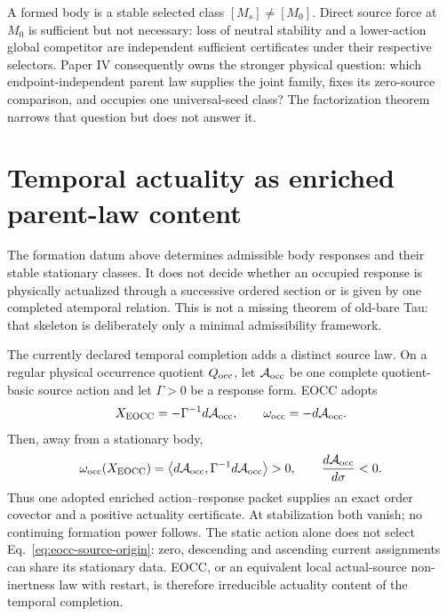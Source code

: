 \documentclass[11pt]{article}
\begin{document}
A formed body is a stable selected class $[M_s]\ne[M_0]$.  Direct source force
at $M_0$ is sufficient but not necessary: loss of neutral stability and a
lower-action global competitor are independent sufficient certificates under
their respective selectors.  Paper IV consequently owns the stronger
physical question: which endpoint-independent parent law supplies the joint
family, fixes its zero-source comparison, and occupies one universal-seed
class?  The factorization theorem narrows that question but does not answer it.

\section{Temporal actuality as enriched parent-law content}

The formation datum above determines admissible body responses and their
stable stationary classes.  It does not decide whether an occupied response
is physically actualized through a successive ordered section or is given by
one completed atemporal relation.  This is not a missing theorem of old-bare
Tau: that skeleton is deliberately only a minimal admissibility framework.

The currently declared temporal completion adds a distinct source law.  On a
regular physical occurrence quotient $Q_{\rm occ}$, let
$\mathcal A_{\rm occ}$ be one complete quotient-basic source action and let
$\Gamma>0$ be a response form.  EOCC adopts
\begin{equation}
 X_{\rm EOCC}=-\Gamma^{-1}d\mathcal A_{\rm occ},
 \qquad
 \omega_{\rm occ}=-d\mathcal A_{\rm occ}.
 \label{eq:eocc-source-origin}
\end{equation}
Then, away from a stationary body,
\begin{equation}
 \omega_{\rm occ}(X_{\rm EOCC})
 =\left\langle d\mathcal A_{\rm occ},
   \Gamma^{-1}d\mathcal A_{\rm occ}\right\rangle>0,
 \qquad
 \frac{d\mathcal A_{\rm occ}}{d\sigma}<0.
 \label{eq:eocc-positive-actuality}
\end{equation}
Thus one adopted enriched action--response packet supplies an exact order
covector and a positive actuality certificate.  At stabilization both vanish;
no continuing formation power follows.  The static action alone does not
select Eq.~\eqref{eq:eocc-source-origin}: zero, descending and ascending
current assignments can share its stationary data.  EOCC, or an equivalent
local actual-source non-inertness law with restart, is therefore irreducible
actuality content of the temporal completion.
\end{document}
